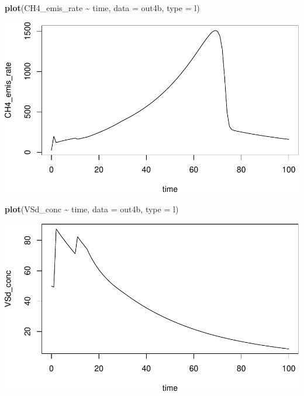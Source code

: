 \documentclass[
]{article}
\newenvironment{Shaded}{\begin{snugshade}}{\end{snugshade}}
\newcommand{\AttributeTok}[1]{\textcolor[rgb]{0.13,0.29,0.53}{#1}}
\newcommand{\FunctionTok}[1]{\textcolor[rgb]{0.13,0.29,0.53}{\textbf{#1}}}
\newcommand{\NormalTok}[1]{#1}
\newcommand{\SpecialCharTok}[1]{\textcolor[rgb]{0.81,0.36,0.00}{\textbf{#1}}}
\newcommand{\StringTok}[1]{\textcolor[rgb]{0.31,0.60,0.02}{#1}}
\begin{document}
\begin{Shaded}
\begin{Highlighting}[]
\FunctionTok{plot}\NormalTok{(CH4\_emis\_rate }\SpecialCharTok{\textasciitilde{}}\NormalTok{ time, }\AttributeTok{data =}\NormalTok{ out4b, }\AttributeTok{type =} \StringTok{\textquotesingle{}l\textquotesingle{}}\NormalTok{)}
\end{Highlighting}
\end{Shaded}

\includegraphics{simple_demo_files/figure-latex/unnamed-chunk-30-2.pdf}

\begin{Shaded}
\begin{Highlighting}[]
\FunctionTok{plot}\NormalTok{(VSd\_conc }\SpecialCharTok{\textasciitilde{}}\NormalTok{ time, }\AttributeTok{data =}\NormalTok{ out4b, }\AttributeTok{type =} \StringTok{\textquotesingle{}l\textquotesingle{}}\NormalTok{)}
\end{Highlighting}
\end{Shaded}

\includegraphics{simple_demo_files/figure-latex/unnamed-chunk-30-3.pdf}
\end{document}
